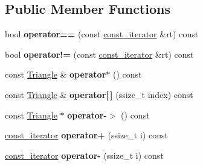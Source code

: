 \subsection*{Public Member Functions}
\begin{DoxyCompactItemize}
\item 
\hypertarget{classMesh__t_1_1const__iterator_a9f420a6682f245fe125134ff77c79ceb}{bool {\bfseries operator==} (const \hyperlink{classMesh__t_1_1const__iterator}{const\+\_\+iterator} \&rt) const }\label{classMesh__t_1_1const__iterator_a9f420a6682f245fe125134ff77c79ceb}

\item 
\hypertarget{classMesh__t_1_1const__iterator_aef0e8e475e9ebc4ed2d8312686a65494}{bool {\bfseries operator!=} (const \hyperlink{classMesh__t_1_1const__iterator}{const\+\_\+iterator} \&rt) const }\label{classMesh__t_1_1const__iterator_aef0e8e475e9ebc4ed2d8312686a65494}

\item 
\hypertarget{classMesh__t_1_1const__iterator_a350801d9318c796df45dc627cfae3030}{const \hyperlink{structTriangle}{Triangle} \& {\bfseries operator$\ast$} () const }\label{classMesh__t_1_1const__iterator_a350801d9318c796df45dc627cfae3030}

\item 
\hypertarget{classMesh__t_1_1const__iterator_aff99bf979efd14f19f7a5689bae8f387}{const \hyperlink{structTriangle}{Triangle} \& {\bfseries operator\mbox{[}$\,$\mbox{]}} (ssize\+\_\+t index) const }\label{classMesh__t_1_1const__iterator_aff99bf979efd14f19f7a5689bae8f387}

\item 
\hypertarget{classMesh__t_1_1const__iterator_a839942103e8fcba845e817f6b1247068}{const \hyperlink{structTriangle}{Triangle} $\ast$ {\bfseries operator-\/$>$} () const }\label{classMesh__t_1_1const__iterator_a839942103e8fcba845e817f6b1247068}

\item 
\hypertarget{classMesh__t_1_1const__iterator_aec122ec9ac2784f2bfb25edd9312486a}{\hyperlink{classMesh__t_1_1const__iterator}{const\+\_\+iterator} {\bfseries operator+} (ssize\+\_\+t i) const }\label{classMesh__t_1_1const__iterator_aec122ec9ac2784f2bfb25edd9312486a}

\item 
\hypertarget{classMesh__t_1_1const__iterator_abb246af63c0fe9bda59bfbf3af590e43}{\hyperlink{classMesh__t_1_1const__iterator}{const\+\_\+iterator} {\bfseries operator-\/} (ssize\+\_\+t i) const }\label{classMesh__t_1_1const__iterator_abb246af63c0fe9bda59bfbf3af590e43}


\end{DoxyCompactItemize}
